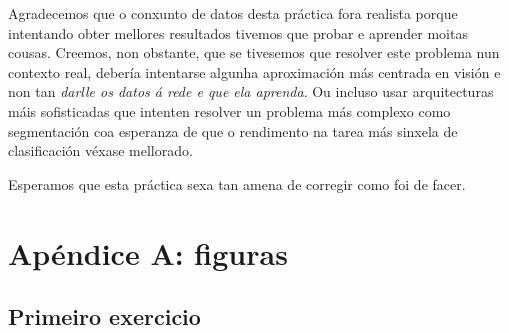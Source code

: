 \documentclass{article}
\begin{document}
Agradecemos que o conxunto de datos desta práctica fora realista porque intentando obter mellores resultados tivemos que probar e aprender moitas cousas. Creemos, non obstante, que se tivesemos que resolver este problema nun contexto real, debería intentarse algunha aproximación más centrada en visión e non tan \emph{darlle os datos á rede e que ela aprenda}. Ou incluso usar arquitecturas máis sofisticadas que intenten resolver un problema más complexo como segmentación coa esperanza de que o rendimento na tarea más sinxela de clasificación véxase mellorado.

Esperamos que esta práctica sexa tan amena de corregir como foi de facer. 

\newpage

\section{Apéndice A: figuras}
\subsection{Primeiro exercicio}
\end{document}
